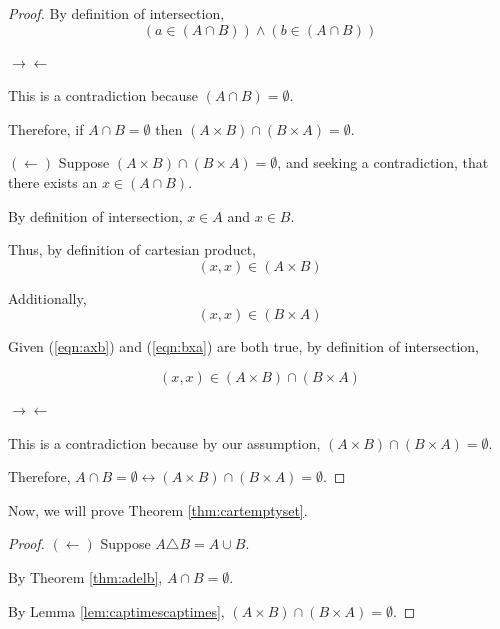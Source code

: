 \documentclass{article}
\newcommand{\contradiction}{$\rightarrow\leftarrow$}
\begin{document}
\begin{outline}[enumerate]
\begin{proof}
        By definition of intersection,
        \begin{equation}
            (a \in (A \cap B)) \wedge (b \in (A \cap B))
        \end{equation}

        \contradiction

        This is a contradiction because $(A \cap B) = \emptyset$.

        Therefore, if $A \cap B = \emptyset$ then $(A \times B) \cap (B \times A) = \emptyset$.

        $(\leftarrow)$ Suppose $(A \times B) \cap (B \times A) = \emptyset$, and seeking a contradiction, that there exists an $x \in (A \cap B)$. 

        By definition of intersection, $x \in A$ and $x \in B$.

        Thus, by definition of cartesian product, 
        \begin{equation}
            (x, x) \in (A \times B)
            \label{eqn:axb}
        \end{equation}

        Additionally,
        \begin{equation}
            (x, x) \in (B \times A)
            \label{eqn:bxa}
        \end{equation}

        Given (\ref{eqn:axb}) and (\ref{eqn:bxa}) are both true, by definition of intersection, 

        \begin{equation}
            (x, x) \in (A \times B) \cap (B \times A)
        \end{equation}

        \contradiction

        This is a contradiction because by our assumption, $(A \times B) \cap (B \times A) = \emptyset$.

        Therefore, $A \cap B = \emptyset \leftrightarrow (A \times B) \cap (B \times A) = \emptyset$.
    \end{proof}

    Now, we will prove Theorem \ref{thm:cartemptyset}.
    
    \begin{proof}
        $(\leftarrow)$ Suppose $A \triangle B = A \cup B$. 
        
        By Theorem \ref{thm:adelb}, $A \cap B = \emptyset$. 
        
        By Lemma \ref{lem:captimescaptimes}, $(A \times B) \cap (B \times A) = \emptyset$.


\end{proof}
\end{outline}
\end{document}
